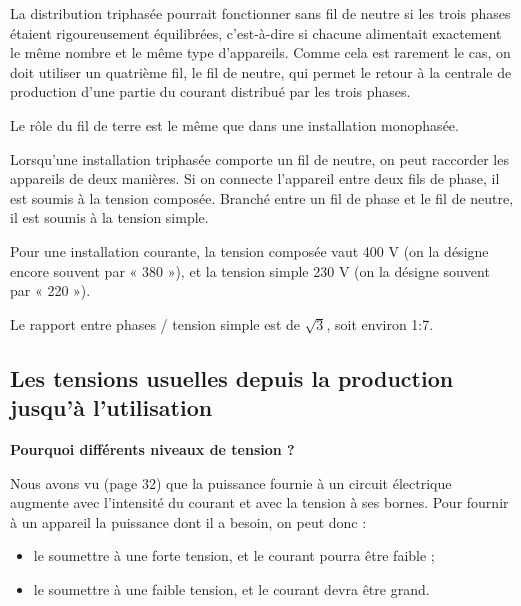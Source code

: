La distribution triphasée pourrait fonctionner sans fil de neutre si les trois phases étaient rigoureusement équilibrées, c’est-à-dire si chacune alimentait exactement le même nombre et le même type d’appareils. Comme cela est rarement le cas, on doit utiliser un quatrième fil, le fil de neutre, qui permet le retour à la centrale de production d’une partie du courant distribué par les trois phases.
\vspace{0.3cm}

Le rôle du fil de terre est le même que dans une installation monophasée.
\vspace{0.3cm}

Lorsqu’une installation triphasée comporte un fil de neutre, on peut raccorder les appareils de deux manières. Si on connecte l’appareil entre deux fils de phase, il est soumis à la tension composée. Branché entre un fil de phase et le fil de neutre, il est soumis à la tension simple.
\vspace{0.3cm}

Pour une installation courante, la tension composée vaut 400 V (on la désigne encore souvent par « 380 »), et la tension simple 230 V (on la désigne souvent par « 220 »).

\vspace{0.3cm}

Le rapport entre phases / tension simple est de $ \sqrt{3} $, soit environ 1:7.


\subsection{Les tensions usuelles depuis la production jusqu’à l’utilisation}

\vspace{0.3cm}
\textbf{Pourquoi différents niveaux de tension ?}
\vspace{0.3cm}

Nous avons vu (page 32) que la puissance fournie à un circuit électrique augmente avec l’intensité du courant et avec la tension à ses bornes. Pour fournir à un appareil la puissance dont il a besoin, on peut donc :

\begin{itemize}

\item le soumettre à une forte tension, et le courant pourra être faible ;
\item le soumettre à une faible tension, et le courant devra être grand.


\end{itemize}

